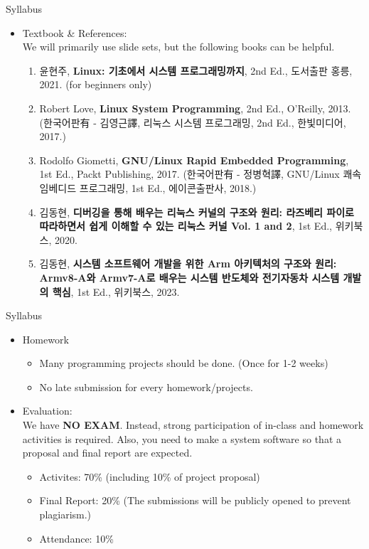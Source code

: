 \begin{frame}{Syllabus}
  \begin{itemize}
  \item Textbook \& References: \\ We will primarily use slide sets, but the following books can be helpful.
    \begin{enumerate}
      \item 윤현주, \textbf{Linux: 기초에서 시스템 프로그래밍까지}, 2nd Ed., 도서출판 홍릉, 2021. (for beginners only)
      \item Robert Love, \textbf{Linux System Programming}, 2nd Ed., O'Reilly, 2013. (한국어판有 - 김영근譯, 리눅스 시스템 프로그래밍, 2nd Ed., 한빛미디어, 2017.)
      \item Rodolfo Giometti, \textbf{GNU/Linux Rapid Embedded Programming}, 1st Ed., Packt Publishing, 2017. (한국어판有 - 정병혁譯, GNU/Linux 쾌속 임베디드 프로그래밍, 1st Ed., 에이콘출판사, 2018.)
      \item 김동현, \textbf{디버깅을 통해 배우는 리눅스 커널의 구조와 원리: 라즈베리 파이로 따라하면서 쉽게 이해할 수 있는 리눅스 커널 Vol. 1 and 2}, 1st Ed., 위키북스, 2020.
      \item 김동현, \textbf{시스템 소프트웨어 개발을 위한 Arm 아키텍처의 구조와 원리: Armv8-A와 Armv7-A로 배우는 시스템 반도체와 전기자동차 시스템 개발의 핵심}, 1st Ed., 위키북스, 2023.
    \end{enumerate}
  \end{itemize}
\end{frame}

\begin{frame}{Syllabus}
  \begin{itemize}  
  \item Homework
    \begin{itemize}
      \item Many programming projects should be done. (Once for 1-2 weeks)
      \item No late submission for every homework/projects.      
    \end{itemize}
  \item Evaluation:\\ We have \textbf{NO EXAM}. Instead, strong participation of in-class and homework activities is required. Also, you need to make a system software so that a proposal and final report are expected.
    \begin{itemize}
      \item Activites: 70\% (including 10\% of project proposal)
      \item Final Report: 20\% (The submissions will be publicly opened to prevent plagiarism.)
      \item Attendance: 10\%
    \end{itemize}    
  \end{itemize}
\end{frame}

